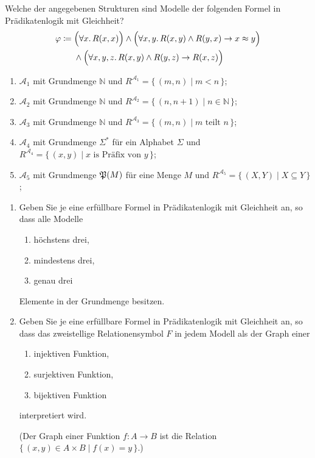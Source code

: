 \documentclass[german]{latteachCD}[2017/03/28]
\begin{document}
\clearpage

\setcounter{exercise}{0}

\begin{exercise}
  Welche der angegebenen Strukturen sind Modelle der folgenden Formel in
  Prädikatenlogik mit Gleichheit?
  \begin{align*}
    \phi \coloneqq{}
    & \Bigl(\forall x.\, R(x,x)\Bigr) \land \Bigl(\forall x, y.\, R(x,y) \land
      R(y,x) \to x \approx y\Bigr)\\
    &\land \Bigl(\forall x, y, z.\, R(x,y) \land R(y,z) \to R(x,z)\Bigr)
  \end{align*}
  \begin{enumerate}
  \item $\mathcal{A}_{1}$ mit Grundmenge $\mathbb N$ und $R^{\mathcal{A}_{1}} =
    \{\,(m,n) \mid m < n \,\}$;
  \item $\mathcal{A}_{2}$ mit Grundmenge $\mathbb N$ und $R^{\mathcal{A}_{2}} =
    \{\,(n,n+1) \mid n \in \mathbb N \,\}$;
  \item $\mathcal{A}_{3}$ mit Grundmenge $\mathbb N$ und $R^{\mathcal{A}_{3}} =
    \{\,(m,n) \mid m \text{ teilt } n\,\}$;
  \item $\mathcal{A}_{4}$ mit Grundmenge $\Sigma^{*}$ für ein Alphabet $\Sigma$
    und $R^{\mathcal{A}_{4}} = \{\,(x,y) \mid x \text{ is Präfix von } y\,\}$;
  \item $\mathcal{A}_{5}$ mit Grundmenge $\subsets{M}$ für eine Menge $M$ und
    $R^{\mathcal{A}_{5}} = \{\,(X,Y) \mid X \subseteq Y\,\}$;
  \end{enumerate}
\end{exercise}

\begin{exercise}
  \begin{enumerate}
  \item Geben Sie je eine erfüllbare Formel in Prädikatenlogik mit Gleichheit
    an, so dass alle Modelle
    \begin{enumerate}
    \item höchstens drei,
    \item mindestens drei,
    \item genau drei
    \end{enumerate}
    Elemente in der Grundmenge besitzen.
  \item Geben Sie je eine erfüllbare Formel in Prädikatenlogik mit Gleichheit
    an, so dass das zweistellige Relationensymbol $F$ in jedem Modell als der
    Graph einer
    \begin{enumerate}
    \item injektiven Funktion,
    \item surjektiven Funktion,
    \item bijektiven Funktion
    \end{enumerate}
    interpretiert wird.

    (Der Graph einer Funktion $f \colon A \to B$ ist die Relation $\{\,(x,y) \in
    A \times B \mid f(x) = y\,\}$.)
  \end{enumerate}
\end{exercise}
\end{document}
